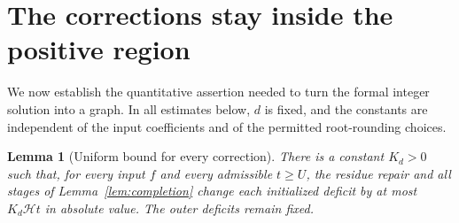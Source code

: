 \documentclass[11pt,a4paper]{article}
\newtheorem{lemma}[theorem]{Lemma}
\theoremstyle{definition}
\newcommand{\htf}{\mathcal H}
\begin{document}
\section{The corrections stay inside the positive region}\label{sec:bounds}

We now establish the quantitative assertion needed to turn the formal
integer solution into a graph. In all estimates below, $d$ is fixed,
and the constants are independent of the input coefficients and of
the permitted root-rounding choices.

\begin{lemma}[Uniform bound for every correction]\label{lem:bound}
There is a constant $K_d>0$ such that, for every input $f$ and
every admissible $t\ge U$, the residue repair and all stages of
Lemma~\ref{lem:completion} change each initialized deficit by at most
$K_d\htf t$ in absolute value. The outer deficits remain fixed.
\end{lemma}
\end{document}
